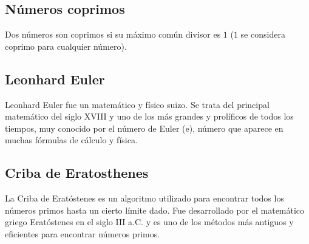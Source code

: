\subsection{Números coprimos}
Dos números son coprimos si su máximo común divisor es $1$ ($1$ se considera coprimo para cualquier número).

\subsection{Leonhard Euler}
Leonhard Euler fue un matemático y físico suizo. Se trata del principal matemático del siglo
XVIII y uno de los más grandes y prolíficos de todos los tiempos, muy conocido por el número de
Euler (e), número que aparece en muchas fórmulas de cálculo y física.

\subsection{Criba de Eratosthenes}
La Criba de Eratóstenes es un algoritmo utilizado para encontrar todos los números primos
hasta un cierto límite dado. Fue desarrollado por el matemático griego Eratóstenes en el siglo III
a.C. y es uno de los métodos más antiguos y eficientes para encontrar números primos.
